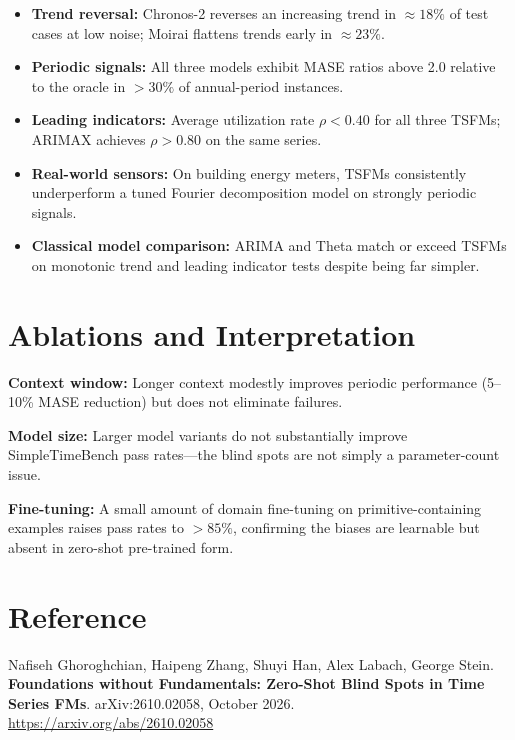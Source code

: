 \documentclass[10pt,twocolumn]{article}
\begin{document}
\begin{itemize}[itemsep=2pt,parsep=0pt]
  \item \textbf{Trend reversal:} Chronos-2 reverses an increasing trend in
    $\approx18\%$ of test cases at low noise; Moirai flattens trends early
    in $\approx23\%$.
  \item \textbf{Periodic signals:} All three models exhibit MASE ratios above 2.0
    relative to the oracle in $>30\%$ of annual-period instances.
  \item \textbf{Leading indicators:} Average utilization rate $\rho < 0.40$
    for all three TSFMs; ARIMAX achieves $\rho > 0.80$ on the same series.
  \item \textbf{Real-world sensors:} On building energy meters, TSFMs consistently
    underperform a tuned Fourier decomposition model on strongly periodic signals.
  \item \textbf{Classical model comparison:} ARIMA and Theta match or exceed TSFMs
    on monotonic trend and leading indicator tests despite being far simpler.
\end{itemize}

\section{Ablations and Interpretation}

\textbf{Context window:} Longer context modestly improves periodic performance
(5--10\% MASE reduction) but does not eliminate failures.

\textbf{Model size:} Larger model variants do not substantially improve
SimpleTimeBench pass rates---the blind spots are not simply a parameter-count issue.

\textbf{Fine-tuning:} A small amount of domain fine-tuning on primitive-containing
examples raises pass rates to $>85\%$, confirming the biases are learnable but
absent in zero-shot pre-trained form.

\section*{Reference}

Nafiseh Ghoroghchian, Haipeng Zhang, Shuyi Han, Alex Labach, George Stein.
\textbf{Foundations without Fundamentals: Zero-Shot Blind Spots in Time Series FMs}.
arXiv:2610.02058, October 2026.\\
\url{https://arxiv.org/abs/2610.02058}
\end{document}
